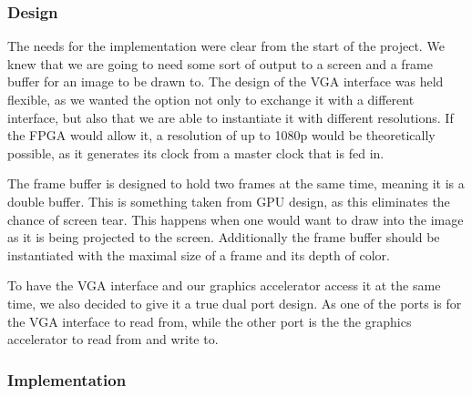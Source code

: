 \subsubsection*{Design}\label{subsubsec:des_buff}
The needs for the implementation were clear from the start of the project. We knew that we are going to need some sort of output to a screen and a frame buffer for an  image to be drawn to. The design of the VGA interface was held flexible, as we wanted the option not only to exchange it with a different interface, but also that we are able to instantiate it with different resolutions. If the FPGA would allow it, a resolution of up to 1080p would be theoretically possible, as it generates its clock from a master clock that is fed in.

The frame buffer is designed to hold two frames at the same time, meaning it is a double buffer. This is something taken from GPU design, as this eliminates the chance of screen tear. This happens when one would want to draw into the image as it is being projected to the screen. Additionally the frame buffer should be instantiated with the maximal size of a frame and its depth of color.

To have the VGA interface and our graphics accelerator access it at the same time, we also decided to give it a true dual port design. As one of the ports is for the VGA interface to read from, while the other port is the the graphics accelerator to read from and write to.


\subsubsection*{Implementation}

